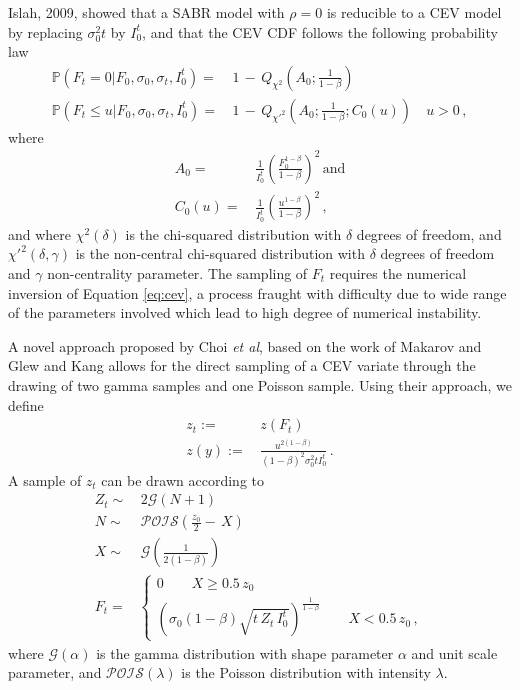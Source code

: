 \documentclass[12pt,oneside]{article}
\newcommand{\beqn}{\begin{equation}}
\newcommand{\eeqn}{\end{equation}}
\newcommand{\beqnn}{\begin{equation*}}
\newcommand{\eeqnn}{\end{equation*}}
\newcommand{\pr}{\mathbb{P}}
\numberwithin{equation}{section}
\begin{document}
Islah, 2009\cite{I}, showed that a SABR model with $\rho=0$ is reducible to a CEV model by replacing
$\sigma^2_0t$ by $I_0^t$, and that
the CEV CDF follows the following probability law
\beqn\label{eq:cev}
\begin{aligned}
\pr(F_t=0\big|F_0,\sigma_0,\sigma_t,I_0^t)=&\,1\,-\,Q_{\chi^2}\left(A_0;\frac{1}{1-\beta}\right)\\
\pr(F_t\le u\big|F_0,\sigma_0,\sigma_t,I_0^t)=&\,1\,-\,Q_{\chi\prime^2}\left(A_0;\frac{1}{1-\beta};C_0(u)\right)
\quad u>0\,,
\end{aligned}
\eeqn
where
\beqnn
\begin{aligned}
    A_0=&\,\frac{1}{I_0^t}\left(\frac{F_0^{1-\beta}}{1-\beta}\right)^2\,\text{and}\\
    C_0(u)=&\,\frac{1}{I_0^t}\left(\frac{u^{1-\beta}}{1-\beta}\right)^2\,,
\end{aligned}
\eeqnn
and where $\chi^2(\delta)$ is the chi-squared distribution
with $\delta$ degrees of freedom, and
$\chi\prime^2(\delta,\gamma)$ is the non-central chi-squared distribution
with $\delta$ degrees of freedom and $\gamma$ non-centrality parameter.
The sampling of $F_t$ requires the numerical inversion of Equation
\eqref{eq:cev}, a process fraught with difficulty due
to wide range of the parameters involved which
lead to high degree of numerical instability.

A novel approach proposed by Choi {\em et al},\cite{CHK} based on the
work of Makarov and Glew\cite{MG} and Kang\cite{K}
allows for the direct sampling of a CEV variate through the
drawing of two gamma samples and one Poisson sample.
Using their approach, we define
\beqnn
\begin{aligned}
    z_t:=&\,z(F_t)\\
    z(y):=&\,\frac{u^{2(1-\beta)}}{(1-\beta)^2\sigma_0^2tI_0^t}\,.
\end{aligned}
\eeqnn
A sample of $z_t$ can be drawn according to
\beqn
\begin{aligned}
    Z_t\sim&\, 2\mathcal{G}(N+1)\\
    N\sim&\, \mathcal{POIS}(\frac{z_0}{2} - \,X)\\
    X\sim&\, \mathcal{G}\left(\frac{1}{2(1-\beta)}\right)\\
    F_t=&
    \begin{cases}
        0\quad\quad X\ge 0.5\,z_0\\
        \left(\sigma_0(1-\beta)\sqrt{t\,Z_t\,I_0^t}\right)^\frac{1}{1-\beta}
        \quad \quad X<0.5\,z_0\,,
    \end{cases}
\end{aligned}
\eeqn
where $\mathcal{G}(\alpha)$ is the gamma distribution with shape parameter
$\alpha$ and unit scale parameter, and
$\mathcal{POIS}(\lambda)$ is the Poisson distribution with intensity $\lambda$.
\end{document}
